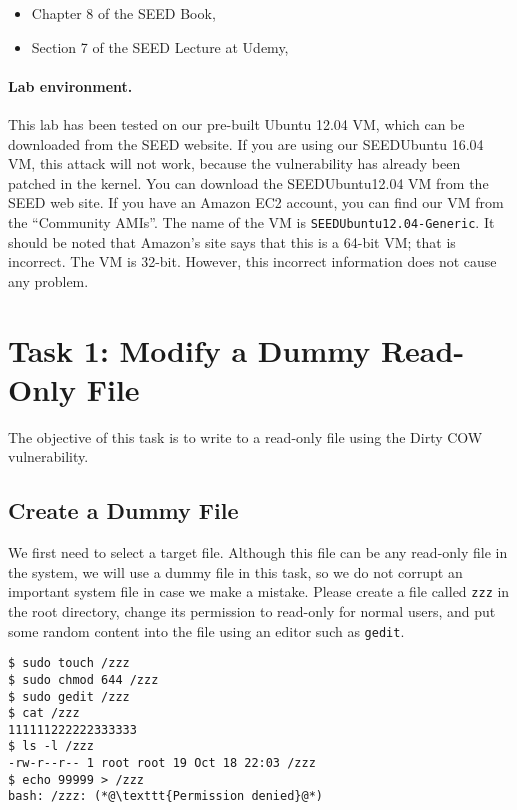 \begin{itemize}
\item Chapter 8 of the SEED Book, \seedbook
\item Section 7 of the SEED Lecture at Udemy, \seedcsvideo
\end{itemize}


\paragraph{Lab environment.} This lab has been tested on our pre-built
Ubuntu 12.04 VM, which can be downloaded from the SEED website.
If you are using our SEEDUbuntu 16.04 VM, this attack will not work, because the 
vulnerability has already been patched in the kernel. 
You can download the SEEDUbuntu12.04 VM from the SEED web
site. If you have an Amazon EC2 account, you can find our VM from 
the ``Community AMIs''. The name of the VM is 
\texttt{SEEDUbuntu12.04-Generic}. It should be noted that
Amazon's site says that this is a 64-bit VM; that is incorrect. The VM is
32-bit. However, this incorrect information does not cause any problem.




\section{Task 1: Modify a Dummy Read-Only File}

The objective of this task is to write to a read-only file using the Dirty
COW vulnerability. 


\subsection{Create a Dummy File}

We first need to select a target file. Although this file can be any read-only
file in the system, we will use a dummy file in this task, so we do not corrupt 
an important system file in
case we make a mistake. Please create a file called \texttt{zzz} 
in the root directory, change its permission to read-only for normal users,
and put some random content into the file using an editor such as \texttt{gedit}. 

\begin{lstlisting}
$ sudo touch /zzz
$ sudo chmod 644 /zzz
$ sudo gedit /zzz
$ cat /zzz
111111222222333333
$ ls -l /zzz
-rw-r--r-- 1 root root 19 Oct 18 22:03 /zzz
$ echo 99999 > /zzz
bash: /zzz: (*@\texttt{Permission denied}@*)
\end{lstlisting}
 
